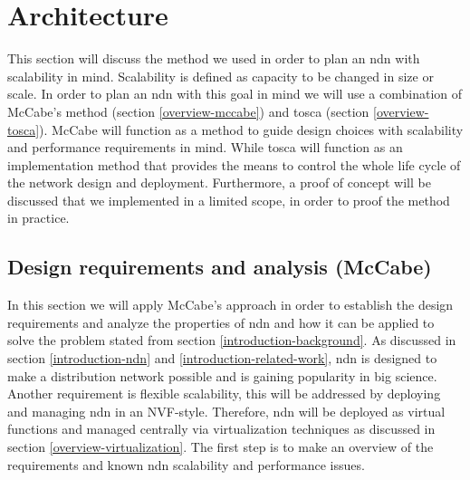 \section{Architecture}



\label{planning-ndn}

This section will discuss the method we used in order to plan an \gls{ndn} with scalability in mind. Scalability is defined as capacity to be changed in size or scale. In order to plan an \gls{ndn} with this goal in mind we will use a combination of McCabe's method (section \ref{overview-mccabe}) and \gls{tosca} (section \ref{overview-tosca}). McCabe will function as a method to guide design choices with scalability and performance requirements in mind. While \gls{tosca} will function as an implementation method that provides the means to control the whole life cycle of the network design and deployment. Furthermore, a proof of concept will be discussed that we implemented in a limited scope, in order to proof the method in practice.


\subsection{Design requirements and analysis (McCabe)}
\label{planning-requirements}
In this section we will apply McCabe's approach in order to establish the design requirements and analyze the properties of \gls{ndn} and how it can be applied to solve the problem stated from section \ref{introduction-background}. As discussed in section \ref{introduction-ndn} and \ref{introduction-related-work}, \gls{ndn} is designed to make a distribution network possible and is gaining popularity in big science. Another requirement is flexible scalability, this will be addressed by deploying and managing \gls{ndn} in an NVF-style. Therefore, \gls{ndn} will be deployed as virtual functions and managed centrally via virtualization techniques as discussed in section \ref{overview-virtualization}. The first step is to make an overview of the requirements and known \gls{ndn} scalability and performance issues.

